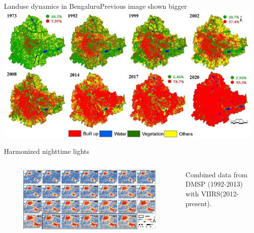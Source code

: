 \documentclass[aspectratio=169]{beamer} %
\begin{document}
\begin{frame}{Landuse dynamics in Bengaluru}{Previous image shown bigger}
  \includegraphics[width=0.9\linewidth]{banglore.jpg}

\end{frame}


\begin{frame}{Harmonized nighttime lights}
  \begin{columns}
    \begin{column}{0.6\textwidth}
      \begin{minipage}[c][0.7\textheight][c]{\linewidth}
        \begin{figure}
          \includegraphics[width=\linewidth]{harmonized.png}
        \end{figure}
      \end{minipage}
    \end{column}
    \begin{column}{0.4\textwidth}
      \begin{minipage}[c][0.6\textheight][c]{\linewidth}
        Combined data from DMSP (1992-2013) with VIIRS(2012-present). 

      \end{minipage}
    \end{column}
  \end{columns}
\end{frame}
\end{document}
